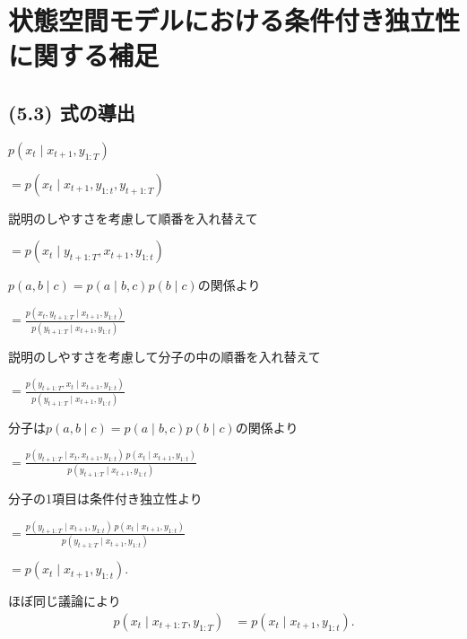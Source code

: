 \documentclass[11pt,a4paper]{jsarticle}
\begin{document}
\appendix
\setcounter{section}{4}
\section{状態空間モデルにおける条件付き独立性に関する補足}
\subsection{(5.3) 式の導出}
\begin{flushleft}
\hspace{30pt} $p(x_t \mid x_{t+1}, y_{1:T})$
\end{flushleft}
\begin{flushleft}
\hspace{20pt} $= p(x_t \mid x_{t+1}, y_{1:t}, y_{t+1:T})$
\end{flushleft}
説明のしやすさを考慮して順番を入れ替えて
\begin{flushleft}
\hspace{20pt} $= p(x_t \mid y_{t+1:T}, x_{t+1}, y_{1:t})$
\end{flushleft}
$p(a, b \mid c) = p(a \mid b, c) p(b \mid c)$の関係より
\begin{flushleft}
\hspace{20pt} $= \displaystyle \frac{p(x_t, y_{t+1:T} \mid x_{t+1}, y_{1:t})}{p(y_{t+1:T} \mid x_{t+1}, y_{1:t})}$
\end{flushleft}
説明のしやすさを考慮して分子の中の順番を入れ替えて
\begin{flushleft}
\hspace{20pt} $= \displaystyle \frac{p(y_{t+1:T}, x_t \mid x_{t+1}, y_{1:t})}{p(y_{t+1:T} \mid x_{t+1}, y_{1:t})}$
\end{flushleft}
分子は$p(a, b \mid c) = p(a \mid b, c) p(b \mid c)$の関係より
\begin{flushleft}
\hspace{20pt} $= \displaystyle \frac{p(y_{t+1:T} \mid x_t, x_{t+1}, y_{1:t}) \, p(x_t \mid x_{t+1}, y_{1:t})}{p(y_{t+1:T} \mid x_{t+1}, y_{1:t})}$
\end{flushleft}
分子の1項目は条件付き独立性より
\begin{flushleft}
\hspace{20pt} $= \displaystyle \frac{p(y_{t+1:T} \mid x_{t+1}, y_{1:t}) \, p(x_t \mid x_{t+1}, y_{1:t})}{p(y_{t+1:T} \mid x_{t+1}, y_{1:t})}$
\end{flushleft}
\begin{flushleft}
\hspace{20pt} $= p(x_t \mid x_{t+1}, y_{1:t}).$
\end{flushleft}

ほぼ同じ議論により
\begin{align}
p(x_t \mid x_{t+1:T}, y_{1:T})
& =
p(x_t \mid x_{t+1}, y_{1:t}). \nonumber
\end{align}
\end{document}
